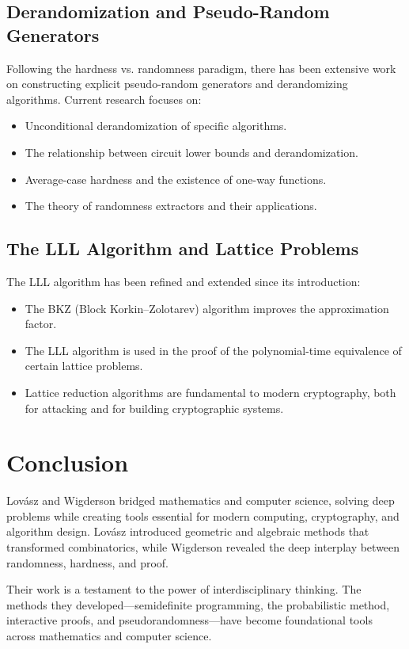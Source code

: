 \subsection{Derandomization and Pseudo-Random Generators}

Following the hardness vs. randomness paradigm, there has been extensive work on constructing explicit pseudo-random generators and derandomizing algorithms. Current research focuses on:

\begin{itemize}
\item Unconditional derandomization of specific algorithms.
\item The relationship between circuit lower bounds and derandomization.
\item Average-case hardness and the existence of one-way functions.
\item The theory of randomness extractors and their applications.
\end{itemize}

\subsection{The LLL Algorithm and Lattice Problems}

The LLL algorithm has been refined and extended since its introduction:
\begin{itemize}
\item The BKZ (Block Korkin--Zolotarev) algorithm improves the approximation factor.
\item The LLL algorithm is used in the proof of the polynomial-time equivalence of certain lattice problems.
\item Lattice reduction algorithms are fundamental to modern cryptography, both for attacking and for building cryptographic systems.
\end{itemize}

\section{Conclusion}

Lov\'asz and Wigderson bridged mathematics and computer science, solving deep problems while creating tools essential for modern computing, cryptography, and algorithm design. Lov\'asz introduced geometric and algebraic methods that transformed combinatorics, while Wigderson revealed the deep interplay between randomness, hardness, and proof.

Their work is a testament to the power of interdisciplinary thinking. The methods they developed---semidefinite programming, the probabilistic method, interactive proofs, and pseudorandomness---have become foundational tools across mathematics and computer science.

